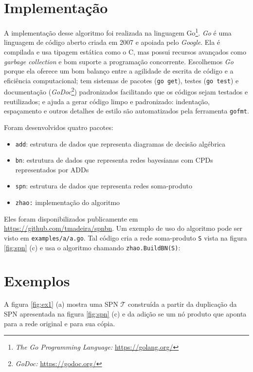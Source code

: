 \section{Implementação}

A implementação desse algoritmo foi realizada na linguagem Go\footnote{\emph{The Go Programming Language:} \url{https://golang.org/}}. \emph{Go} é uma linguagem de código aberto criada em 2007 e apoiada pelo \emph{Google}. Ela é compilada e usa tipagem estática como o C, mas possui recursos avançados como \emph{garbage collection} e bom suporte a programação concorrente. Escolhemos \emph{Go} porque ela oferece um bom balanço entre a agilidade de escrita de código e a eficiência computacional; tem sistemas de pacotes ({\tt go get}), testes ({\tt go test}) e documentação (\emph{GoDoc}\footnote{\emph{GoDoc:} \url{https://godoc.org/}}) padronizados facilitando que os códigos sejam testados e reutilizados; e ajuda a gerar código limpo e padronizado: indentação, espaçamento e outros detalhes de estilo são automatizados pela ferramenta {\tt gofmt}.

Foram desenvolvidos quatro pacotes:

\begin{itemize}
  \item {\tt add}: estrutura de dados que representa diagramas de decisão algébrica
  \item {\tt bn}: estrutura de dados que representa redes bayesianas com CPDs representados por ADDs
  \item {\tt spn}: estrutura de dados que representa redes soma-produto
  \item {\tt zhao:} implementação do algoritmo
\end{itemize}

Eles foram disponibilizados publicamente em \url{https://github.com/tmadeira/spnbn}. Um exemplo de uso do algoritmo pode ser visto em {\tt examples/a/a.go}. Tal código cria a rede soma-produto {\tt S} vista na figura \ref{fig:spn} (c) e usa o algoritmo chamando {\tt zhao.BuildBN(S)}:



\section{Exemplos}

A figura \ref{fig:ex1} (a) mostra uma SPN $\mathcal{T}$ construída a partir da duplicação da SPN apresentada na figura \ref{fig:spn} (c) e da adição se um nó produto que aponta para a rede original e para sua cópia.

